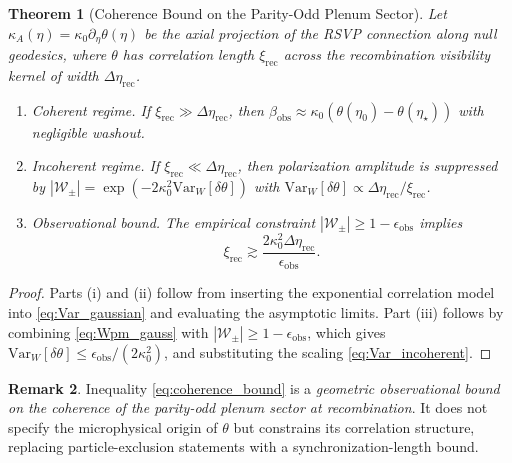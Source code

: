 \documentclass[12pt]{article}
\newtheorem{theorem}{Theorem}[section]
\theoremstyle{definition}
\newtheorem{remark}[theorem]{Remark}
\newcommand{\kA}{\kappa_A}
\newcommand{\Wrec}{\Delta\eta_{\mathrm{rec}}}
\newcommand{\xirec}{\xi_{\mathrm{rec}}}
\newcommand{\betaobs}{\beta_{\mathrm{obs}}}
\newcommand{\etastar}{\eta_\star}
\newcommand{\etaobs}{\eta_0}
\newcommand{\Wpm}{\mathcal{W}_\pm}
\newcommand{\VarW}{\mathrm{Var}_W}
\begin{document}
\begin{theorem}[Coherence Bound on the Parity-Odd Plenum Sector]
\label{thm:coherence}
Let $\kA(\eta)=\kappa_0\partial_\eta\theta(\eta)$ be the axial projection
of the RSVP connection along null geodesics, where $\theta$ has
correlation length $\xirec$ across the recombination visibility kernel
of width $\Wrec$.

\begin{enumerate}[label=\textup{(\roman*)}]
  \item \emph{Coherent regime.}
        If $\xirec\gg\Wrec$, then
        $\betaobs\approx\kappa_0(\theta(\etaobs)-\theta(\etastar))$
        with negligible washout.
  \item \emph{Incoherent regime.}
        If $\xirec\ll\Wrec$, then polarization amplitude is suppressed by
        $|\Wpm|=\exp(-2\kappa_0^2\VarW[\delta\theta])$
        with $\VarW[\delta\theta]\propto\Wrec/\xirec$.
  \item \emph{Observational bound.}
        The empirical constraint $|\Wpm|\geq1-\epsilon_{\mathrm{obs}}$
        \cite{MinamiKomatsu2020,Sherfield2023} implies
        \begin{equation}
          \boxed{\xirec \gtrsim
                \frac{2\kappa_0^2\Wrec}{\epsilon_{\mathrm{obs}}}.}
          \label{eq:coherence_bound}
        \end{equation}
\end{enumerate}
\end{theorem}

\begin{proof}
Parts (i) and (ii) follow from inserting the exponential correlation
model into \eqref{eq:Var_gaussian} and evaluating the asymptotic limits.
Part (iii) follows by combining \eqref{eq:Wpm_gauss} with
$|\Wpm|\geq1-\epsilon_{\mathrm{obs}}$, which gives
$\VarW[\delta\theta]\leq\epsilon_{\mathrm{obs}}/(2\kappa_0^2)$,
and substituting the scaling \eqref{eq:Var_incoherent}.
\end{proof}

\begin{remark}
  Inequality \eqref{eq:coherence_bound} is a \emph{geometric observational
  bound on the coherence of the parity-odd plenum sector at recombination}.
  It does not specify the microphysical origin of $\theta$ but constrains
  its correlation structure, replacing particle-exclusion statements with
  a synchronization-length bound.
\end{remark}

\end{document}

